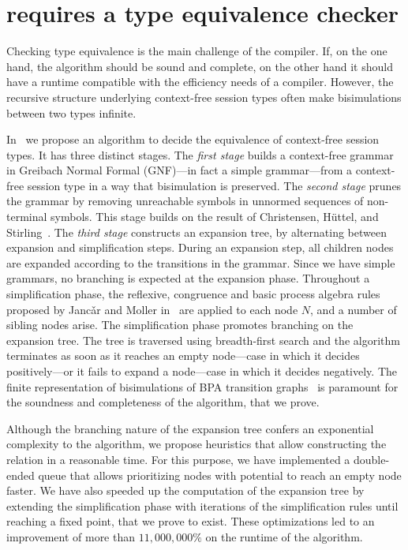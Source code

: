\section{\freest{} requires a type equivalence checker}
\label{sec:equivalence}

Checking type equivalence is the main challenge of the
compiler. If, on the one hand, the algorithm should be sound and 
complete, on the other hand it should have a runtime compatible
with the efficiency needs of a compiler.
However, the recursive structure underlying context-free 
session types often make bisimulations between two types infinite. 

In~\cite{typeEquivalence} we propose an algorithm to decide
the equivalence of context-free session types. 
It has three distinct stages.
%
The \emph{first stage} builds a context-free grammar in Greibach
Normal Formal (GNF)---in fact a simple grammar---from a context-free
session type in a way that bisimulation is preserved.  
%
The \emph{second stage} prunes the grammar by removing unreachable
symbols in unnormed sequences of non-terminal symbols. This stage
builds on the result of Christensen, H\"uttel, and 
Stirling~\cite{DBLP:journals/iandc/ChristensenHS95}.
%
The \emph{third stage} constructs an expansion tree, by alternating
between expansion and simplification steps. During an expansion step, 
all children nodes are expanded according to the transitions in the 
grammar. Since we have simple grammars, no branching is expected at the
expansion phase. Throughout a simplification phase, the reflexive, 
congruence and basic process algebra
rules proposed by Janc\v ar and Moller in~\cite{janvcar1999techniques}
are applied to each node $N$, and a number of sibling nodes arise.
The simplification phase promotes branching on the expansion tree.
The tree is traversed using breadth-first search and the 
algorithm terminates as soon as it reaches an empty node---case
in which it decides positively---or it fails to expand a node---case
in which it decides negatively.  
The finite representation of bisimulations of BPA transition
graphs~\cite{caucal1986decidabilite, DBLP:journals/iandc/ChristensenHS95} 
is paramount for the soundness and completeness of the algorithm,
that we prove. 

Although the branching nature of the expansion tree confers an exponential 
complexity to the algorithm, we propose heuristics that allow constructing 
the relation in a reasonable time. For this purpose, we have implemented a
double-ended queue that allows prioritizing nodes with potential to 
reach an empty node faster. 
We have also speeded up the computation of the expansion
tree by extending the simplification phase with iterations of the 
simplification rules until reaching a fixed point, that we prove to exist.
These optimizations led to an improvement of more than $11,000,000\%$
on the runtime of the algorithm.

